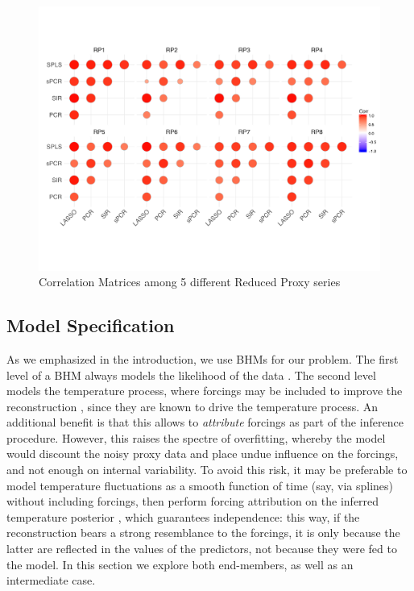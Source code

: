\documentclass[12pt]{amsart}
\theoremstyle{plain}
\theoremstyle{definition}
\theoremstyle{remark}
\begin{document}
\begin{figure}
  \centering
 \includegraphics[scale=0.38]{CorMatrixRPs} 
  \caption{Correlation Matrices among 5 different Reduced Proxy series}
  \label{fig:CorrRPs}
\end{figure}


\subsection{Model Specification}
\label{sec:modelspec}
As we emphasized in the introduction, we use BHMs for our problem. The first level of a BHM always models the likelihood of the data \citep{Tingley_QSR2012}. The second level models the temperature process, where forcings may be included to improve
the reconstruction \citep{Barboza2014,boli1}, since they are known to drive the temperature process. An additional benefit is that this allows to {\it attribute} forcings \citep[i.e., determine causality,][]{HegerlZwiers:2011} as part of the inference procedure. However, this raises the spectre of overfitting, whereby the model would discount the noisy proxy data and place undue influence on the forcings, and not enough on internal variability. To avoid this risk, it may be preferable to model temperature fluctuations as a smooth function of time (say, via splines) without including forcings, then perform forcing attribution on the inferred temperature posterior \citep{Schurer2013a,Schurer2013b}, which guarantees independence: this way, if the reconstruction bears a strong resemblance to the forcings, it is only because the latter are reflected in the values of the predictors, not because they were fed to the model. In this section we explore both end-members, as well as an intermediate case. 
\end{document}
